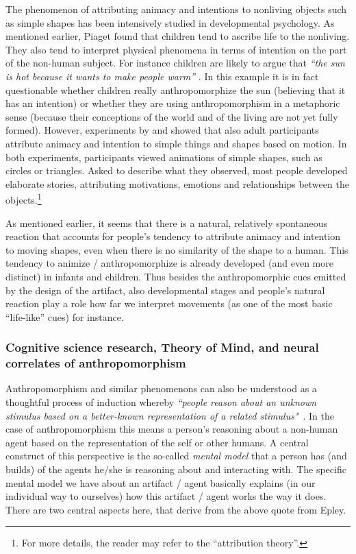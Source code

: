 \documentclass{frontiersSCNS} %
\begin{document}
The phenomenon of attributing animacy and intentions to nonliving objects such
as simple shapes has been intensively studied in developmental psychology. As
mentioned earlier, Piaget found that children tend to ascribe life to the
nonliving. They also tend to interpret physical phenomena in terms of intention
on the part of the non-human subject. For instance children are likely to argue
that \textit{``the sun is hot because it wants to make people warm''}
\citep{leeds_childrens_1992}. In this example it is in fact questionable whether
children really anthropomorphize the sun (believing that it has an intention) or
whether they are using anthropomorphism in a metaphoric sense (because their
conceptions of the world and of the living are not yet fully formed). However,
experiments by \cite{heider_experimental_1944} and
\cite{michotte_perception_1963} showed that also adult participants attribute
animacy and intention to simple things and shapes based on motion. In both
experiments, participants viewed animations of simple shapes, such as circles or
triangles. Asked to describe what they observed, most people developed elaborate
stories, attributing motivations, emotions and relationships between the
objects.\footnote{For more details, the reader may refer to the ``attribution
theory''.}

As mentioned earlier, it seems that there is a natural, relatively spontaneous
reaction that accounts for people's tendency to attribute animacy and intention
to moving shapes, even when there is no similarity of the shape to a human. This
tendency to animize / anthropomorphize is already developed (and even more
distinct) in infants and children. Thus besides the anthropomorphic cues emitted
by the design of the artifact, also developmental stages and people's natural
reaction play a role how far we interpret movements (as one of the
most basic ``life-like'' cues) for instance.


\subsubsection{Cognitive science research, Theory of Mind, and neural correlates
of anthropomorphism\\}

\label{sec:cognitive-expl}

Anthropomorphism and similar phenomenons can also be understood as a thoughtful
process of induction whereby \textit{``people reason about an unknown stimulus
based on a better-known representation of a related
stimulus"}~\citep{epley_when_2008}. In the case of anthropomorphism this means a
person's reasoning about a non-human agent based on the representation of the
self or other humans. A central construct of this perspective is the so-called
\textit{mental model} that a person has (and builds) of the agents he/she is
reasoning about and interacting with. The specific mental model we have about an
artifact / agent basically explains (in our individual way to ourselves) how
this artifact / agent works the way it does.  There are two central aspects
here, that derive from the above quote from Epley.
\end{document}
